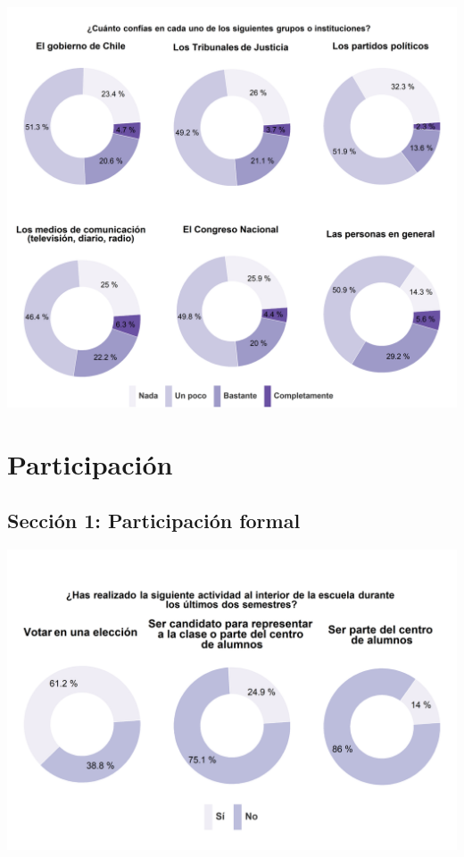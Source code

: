 \documentclass[
  14pt,
]{book}
\begin{document}
\begin{center}\includegraphics[width=62.99in]{images/graph_cgp} \end{center}

\hypertarget{participaciuxf3n}{%
\chapter{Participación}\label{participaciuxf3n}}

\hypertarget{secciuxf3n-1-participaciuxf3n-formal}{%
\section{Sección 1: Participación formal}\label{secciuxf3n-1-participaciuxf3n-formal}}

\begin{center}\includegraphics[width=52.49in]{images/graph_partform_act} \end{center}
\end{document}

